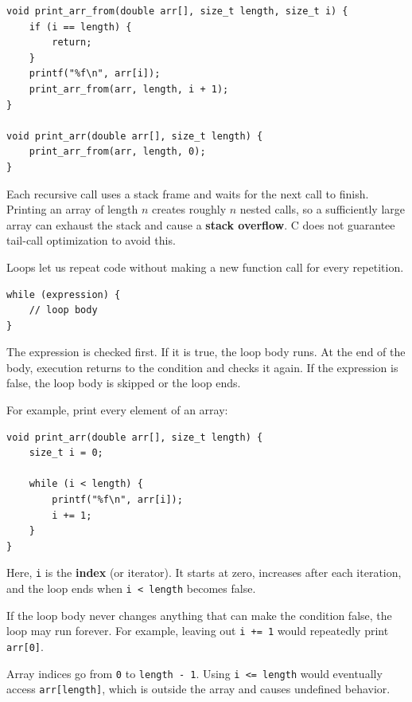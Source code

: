 \documentclass[11pt,a4paper]{article}
\begin{document}
\begin{lstlisting}[style=cscode]
void print_arr_from(double arr[], size_t length, size_t i) {
    if (i == length) {
        return;
    }
    printf("%f\n", arr[i]);
    print_arr_from(arr, length, i + 1);
}

void print_arr(double arr[], size_t length) {
    print_arr_from(arr, length, 0);
}
\end{lstlisting}

Each recursive call uses a stack frame and waits for the next call to finish. Printing an array of length \(n\) creates roughly \(n\) nested calls, so a sufficiently large array can exhaust the stack and cause a \textbf{stack overflow}. C does not guarantee tail-call optimization to avoid this.

Loops let us repeat code without making a new function call for every repetition.

\label{while-loops}
\hypertarget{while-loops}{}

\begin{lstlisting}[style=cscode]
while (expression) {
    // loop body
}
\end{lstlisting}

The expression is checked first. If it is true, the loop body runs. At the end of the body, execution returns to the condition and checks it again. If the expression is false, the loop body is skipped or the loop ends.

For example, print every element of an array:

\begin{lstlisting}[style=cscode]
void print_arr(double arr[], size_t length) {
    size_t i = 0;

    while (i < length) {
        printf("%f\n", arr[i]);
        i += 1;
    }
}
\end{lstlisting}

Here, \texttt{i} is the \textbf{index} (or iterator). It starts at zero, increases after each iteration, and the loop ends when \texttt{i\ \textless{}\ length} becomes false.

If the loop body never changes anything that can make the condition false, the loop may run forever. For example, leaving out \texttt{i\ +=\ 1} would repeatedly print \texttt{arr{[}0{]}}.

Array indices go from \texttt{0} to \texttt{length\ -\ 1}. Using \texttt{i\ \textless{}=\ length} would eventually access \texttt{arr{[}length{]}}, which is outside the array and causes undefined behavior.
\end{document}
